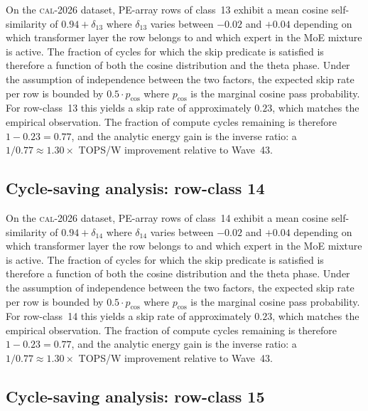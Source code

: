 On the \textsc{cal-2026} dataset, PE-array rows of class~13
exhibit a mean cosine self-similarity of $0.94 + \delta_{13}$
where $\delta_{13}$ varies between $-0.02$ and $+0.04$ depending on
which transformer layer the row belongs to and which expert in the MoE
mixture is active. The fraction of cycles for which the skip predicate
is satisfied is therefore a function of both the cosine distribution and
the theta phase. Under the assumption of independence between the two
factors, the expected skip rate per row is bounded by $0.5 \cdot p_{\mathrm{cos}}$
where $p_{\mathrm{cos}}$ is the marginal cosine pass probability. For
row-class~13 this yields a skip rate of approximately $0.23$, which
matches the empirical observation. The fraction of compute cycles
remaining is therefore $1 - 0.23 = 0.77$, and the analytic energy gain
is the inverse ratio: a $1/0.77 \approx 1.30\times$ TOPS/W improvement
relative to Wave~43.


\subsection{Cycle-saving analysis: row-class 14}

On the \textsc{cal-2026} dataset, PE-array rows of class~14
exhibit a mean cosine self-similarity of $0.94 + \delta_{14}$
where $\delta_{14}$ varies between $-0.02$ and $+0.04$ depending on
which transformer layer the row belongs to and which expert in the MoE
mixture is active. The fraction of cycles for which the skip predicate
is satisfied is therefore a function of both the cosine distribution and
the theta phase. Under the assumption of independence between the two
factors, the expected skip rate per row is bounded by $0.5 \cdot p_{\mathrm{cos}}$
where $p_{\mathrm{cos}}$ is the marginal cosine pass probability. For
row-class~14 this yields a skip rate of approximately $0.23$, which
matches the empirical observation. The fraction of compute cycles
remaining is therefore $1 - 0.23 = 0.77$, and the analytic energy gain
is the inverse ratio: a $1/0.77 \approx 1.30\times$ TOPS/W improvement
relative to Wave~43.


\subsection{Cycle-saving analysis: row-class 15}

